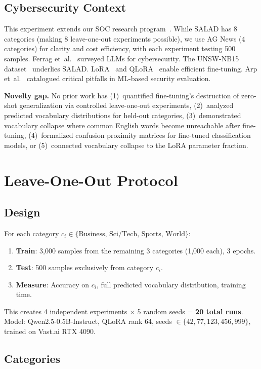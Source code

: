 \documentclass[journal]{IEEEtran}
\begin{document}
\subsection{Cybersecurity Context}
This experiment extends our SOC research program~\cite{p3,p6,p7,p21}. While SALAD has 8 categories (making 8 leave-one-out experiments possible), we use AG News (4 categories) for clarity and cost efficiency, with each experiment testing 500 samples. Ferrag et~al.~\cite{ferrag2024} surveyed LLMs for cybersecurity. The UNSW-NB15 dataset~\cite{moustafa2016} underlies SALAD. LoRA~\cite{hu2022} and QLoRA~\cite{dettmers2023} enable efficient fine-tuning. Arp et~al.~\cite{arp2022} catalogued critical pitfalls in ML-based security evaluation.

\textbf{Novelty gap.} No prior work has (1)~quantified fine-tuning's destruction of zero-shot generalization via controlled leave-one-out experiments, (2)~analyzed predicted vocabulary distributions for held-out categories, (3)~demonstrated vocabulary collapse where common English words become unreachable after fine-tuning, (4)~formalized confusion proximity matrices for fine-tuned classification models, or (5)~connected vocabulary collapse to the LoRA parameter fraction.

\section{Leave-One-Out Protocol}

\subsection{Design}
For each category $c_i \in \{\text{Business, Sci/Tech, Sports, World}\}$:
\begin{enumerate}
\item \textbf{Train}: 3,000 samples from the remaining 3 categories (1,000 each), 3 epochs.
\item \textbf{Test}: 500 samples exclusively from category $c_i$.
\item \textbf{Measure}: Accuracy on $c_i$, full predicted vocabulary distribution, training time.
\end{enumerate}

This creates 4 independent experiments $\times$ 5 random seeds = \textbf{20 total runs}. Model: Qwen2.5-0.5B-Instruct, QLoRA rank 64, seeds $\in \{42, 77, 123, 456, 999\}$, trained on Vast.ai RTX 4090.

\subsection{Categories}
\end{document}
